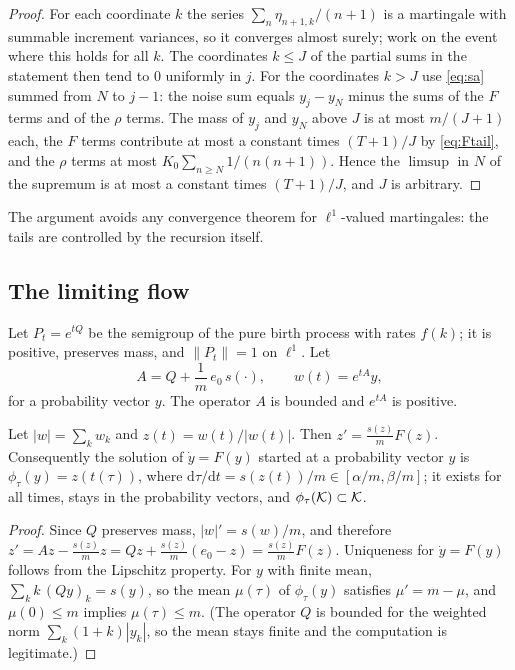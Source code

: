 \begin{proof}
For each coordinate $k$ the series $\sum_n\eta_{n+1,k}/(n+1)$ is a martingale with summable increment variances,
so it converges almost surely; work on the event where this holds for all $k$. The coordinates $k\le J$ of the
partial sums in the statement then tend to $0$ uniformly in $j$. For the coordinates $k>J$ use \eqref{eq:sa}
summed from $N$ to $j-1$: the noise sum equals $y_j-y_N$ minus the sums of the $F$ terms and of the $\rho$ terms.
The mass of $y_j$ and $y_N$ above $J$ is at most $m/(J+1)$ each, the $F$ terms contribute at most a constant times
$(T+1)/J$ by \eqref{eq:Ftail}, and the $\rho$ terms at most $K_0\sum_{n\ge N}1/(n(n+1))$. Hence the $\limsup$ in
$N$ of the supremum is at most a constant times $(T+1)/J$, and $J$ is arbitrary.
\end{proof}

The argument avoids any convergence theorem for $\ell^1$-valued martingales: the tails are controlled by the
recursion itself.

\subsection{The limiting flow}

Let $P_t=e^{tQ}$ be the semigroup of the pure birth process with rates $f(k)$; it is positive, preserves mass,
and $\|P_t\|=1$ on $\ell^1$. Let
\[
   A=Q+\frac1m\,e_0\,s(\cdot),\qquad w(t)=e^{tA}y,
\]
for a probability vector $y$. The operator $A$ is bounded and $e^{tA}$ is positive.

\begin{lemma}\label{lem:flowrep}
Let $|w|=\sum_kw_k$ and $z(t)=w(t)/|w(t)|$. Then $z'=\frac{s(z)}{m}F(z)$. Consequently the solution of
$\dot y=F(y)$ started at a probability vector $y$ is $\phi_\tau(y)=z(t(\tau))$, where
$\mathrm d\tau/\mathrm dt=s(z(t))/m\in[\alpha/m,\beta/m]$; it exists for all times, stays in the probability
vectors, and $\phi_\tau(\mathcal{K})\subset\mathcal{K}$.
\end{lemma}

\begin{proof}
Since $Q$ preserves mass, $|w|'=s(w)/m$, and therefore
$z'=Az-\frac{s(z)}mz=Qz+\frac{s(z)}m(e_0-z)=\frac{s(z)}mF(z)$. Uniqueness for $\dot y=F(y)$ follows from the
Lipschitz property. For $y$ with finite mean, $\sum_kk\,(Qy)_k=s(y)$, so the mean $\mu(\tau)$ of $\phi_\tau(y)$
satisfies $\mu'=m-\mu$, and $\mu(0)\le m$ implies $\mu(\tau)\le m$. (The operator $Q$ is bounded for the weighted
norm $\sum_k(1+k)|y_k|$, so the mean stays finite and the computation is legitimate.)
\end{proof}

